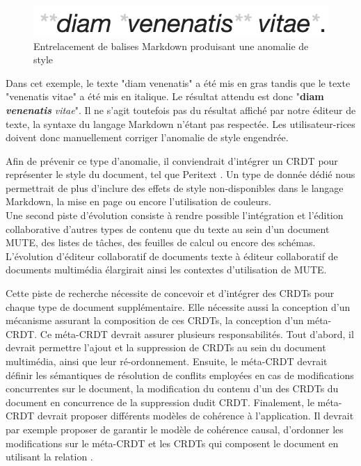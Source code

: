 \begin{figure}
    \centering
    \includegraphics[width=0.5\columnwidth]{img/screenshot-mute-interleaving-markdown}
    \caption{Entrelacement de balises Markdown produisant une anomalie de style}
    \label{fig:mute-interleaving-markdown}
\end{figure}

Dans cet exemple, le texte "diam venenatis" a été mis en gras tandis que le texte "venenatis vitae" a été mis en italique.
Le résultat attendu est donc "\textbf{diam \emph{venenatis}} \emph{vitae}".
Il ne s'agit toutefois pas du résultat affiché par notre éditeur de texte, la syntaxe du langage Markdown n'étant pas respectée.
Les utilisateur-rices doivent donc manuellement corriger l'anomalie de style engendrée.

Afin de prévenir ce type d'anomalie, il conviendrait d'intégrer un \ac{CRDT} pour représenter le style du document, tel que Peritext \cite{2022-peritext-litt}.
Un type de donnée dédié nous permettrait de plus d'inclure des effets de style non-disponibles dans le langage Markdown, \eg la mise en page ou encore l'utilisation de couleurs.\\

Une second piste d'évolution consiste à rendre possible l'intégration et l'édition collaborative d'autres types de contenu que du texte au sein d'un document \ac{MUTE}, \eg des listes de tâches, des feuilles de calcul ou encore des schémas.
L'évolution d'éditeur collaboratif de documents texte à éditeur collaboratif de documents multimédia élargirait ainsi les contextes d'utilisation de \ac{MUTE}.

Cette piste de recherche nécessite de concevoir et d'intégrer des \acp{CRDT} pour chaque type de document supplémentaire.
Elle nécessite aussi la conception d'un mécanisme assurant la composition de ces \acp{CRDT}, \ie la conception d'un méta-\ac{CRDT}.
Ce méta-\ac{CRDT} devrait assurer plusieurs responsabilités.
Tout d'abord, il devrait permettre l'ajout et la suppression de \acp{CRDT} au sein du document multimédia, ainsi que leur ré-ordonnement.
Ensuite, le méta-\ac{CRDT} devrait définir les sémantiques de résolution de conflits employées en cas de modifications concurrentes sur le document, \eg la modification du contenu d'un des \acp{CRDT} du document en concurrence de la suppression dudit \ac{CRDT}.
Finalement, le méta-\ac{CRDT} devrait proposer différents modèles de cohérence à l'application.
Il devrait par exemple proposer de garantir le modèle de cohérence causal, \ie d'ordonner les modifications sur le méta-\ac{CRDT} et les \acp{CRDT} qui composent le document en utilisant la relation \hb {}.
